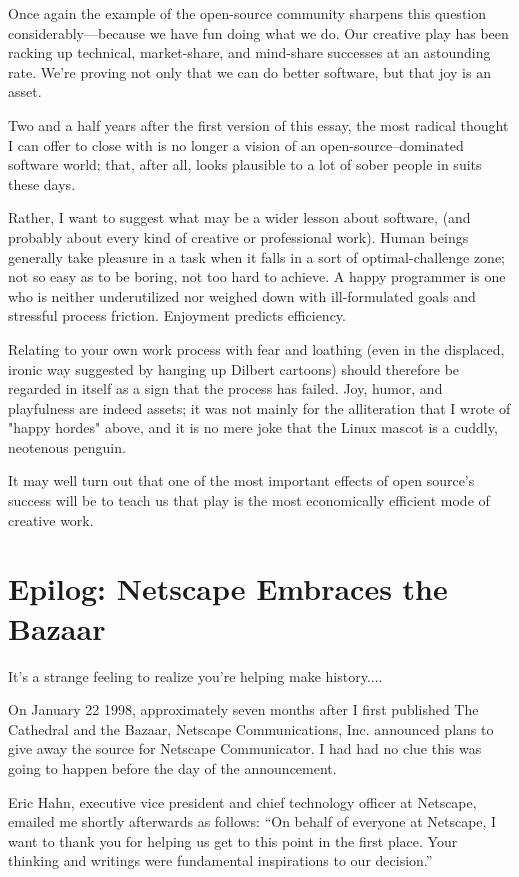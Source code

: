 \documentclass[a4paper,12pt,UTF8,twoside]{ctexbook}
\begin{document}
Once again the example of the open-source community sharpens this question considerably—because we have fun doing what we do. Our creative play has been racking up technical, market-share, and mind-share successes at an astounding rate. We're proving not only that we can do better software, but that joy is an asset.

Two and a half years after the first version of this essay, the most radical thought I can offer to close with is no longer a vision of an open-source–dominated software world; that, after all, looks plausible to a lot of sober people in suits these days.

Rather, I want to suggest what may be a wider lesson about software, (and probably about every kind of creative or professional work). Human beings generally take pleasure in a task when it falls in a sort of optimal-challenge zone; not so easy as to be boring, not too hard to achieve. A happy programmer is one who is neither underutilized nor weighed down with ill-formulated goals and stressful process friction. Enjoyment predicts efficiency.

Relating to your own work process with fear and loathing (even in the displaced, ironic way suggested by hanging up Dilbert cartoons) should therefore be regarded in itself as a sign that the process has failed. Joy, humor, and playfulness are indeed assets; it was not mainly for the alliteration that I wrote of "happy hordes" above, and it is no mere joke that the Linux mascot is a cuddly, neotenous penguin.

It may well turn out that one of the most important effects of open source's success will be to teach us that play is the most economically efficient mode of creative work.

\chapter{Epilog: Netscape Embraces the Bazaar}

It's a strange feeling to realize you're helping make history....

On January 22 1998, approximately seven months after I first published The Cathedral and the Bazaar, Netscape Communications, Inc. announced plans to give away the source for Netscape Communicator. I had had no clue this was going to happen before the day of the announcement.

Eric Hahn, executive vice president and chief technology officer at Netscape, emailed me shortly afterwards as follows: ``On behalf of everyone at Netscape, I want to thank you for helping us get to this point in the first place. Your thinking and writings were fundamental inspirations to our decision.''
\end{document}
